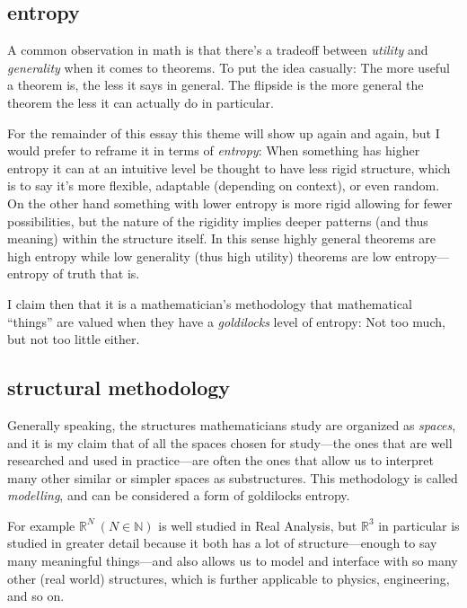 \documentclass[twoside]{article}
\begin{document}
\subsection*{entropy}

A common observation in math is that there's a tradeoff between \emph{utility} and \emph{generality} when
it comes to theorems. To put the idea casually: The more useful a theorem is, the less it says in general.
The flipside is the more general the theorem the less it can actually do in particular.

For the remainder of this essay this theme will show up again and again, but I would prefer to reframe it in terms
of \emph{entropy}: When something has higher entropy it can at an intuitive level be thought to have less rigid
structure, which is to say it's more flexible, adaptable (depending on context), or even random. On the other hand
something with lower entropy is more rigid allowing for fewer possibilities, but the nature of the rigidity implies
deeper patterns (and thus meaning) within the structure itself. In this sense highly general theorems are high entropy
while low generality (thus high utility) theorems are low entropy---entropy of truth that is.

I claim then that it is a mathematician's methodology that mathematical ``things'' are valued when they have
a \emph{goldilocks} level of entropy: Not too much, but not too little either.

\subsection*{structural methodology}

Generally speaking, the structures mathematicians study are organized as \emph{spaces}, and it is my claim that of all the
spaces chosen for study---the ones that are well researched and used in practice---are often the ones that allow us to interpret
many other similar or simpler spaces as substructures. This methodology is called \emph{modelling}, and can be considered
a form of goldilocks entropy.

For example $ \mathbb{R}^N\ (N\in\mathbb{N}) $ is well studied in Real Analysis, but $ \mathbb{R}^3 $ in particular is studied
in greater detail because it both has a lot of structure---enough to say many meaningful things---and also allows us to model
and interface with so many other (real world) structures, which is further applicable to physics, engineering, and so on.
\end{document}
